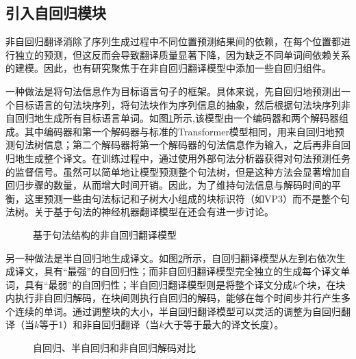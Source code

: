 
\subsection{引入自回归模块}

\parinterval 非自回归翻译消除了序列生成过程中不同位置预测结果间的依赖，在每个位置都进行独立的预测，但这反而会导致翻译质量显著下降，因为缺乏不同单词间依赖关系的建模。因此，也有研究聚焦于在非自回归翻译模型中添加一些自回归组件。

\parinterval 一种做法是将句法信息作为目标语言句子的框架。具体来说，先自回归地预测出一个目标语言的句法块序列，将句法块作为序列信息的抽象，然后根据句法块序列非自回归地生成所有目标语言单词。如图\ref{fig:14-21}所示,该模型由一个编码器和两个解码器组成。其中编码器和第一个解码器与标准的Transformer模型相同，用来自回归地预测句法树信息；第二个解码器将第一个解码器的句法信息作为输入，之后再非自回归地生成整个译文。在训练过程中，通过使用外部句法分析器获得对句法预测任务的监督信号。虽然可以简单地让模型预测整个句法树，但是这种方法会显著增加自回归步骤的数量，从而增大时间开销。因此，为了维持句法信息与解码时间的平衡，这里预测一些由句法标记和子树大小组成的块标识符（如VP3）而不是整个句法树。关于基于句法的神经机器翻译模型在{\chapterfifteen}还会有进一步讨论。

\begin{figure}[htp]
\centering

\caption{基于句法结构的非自回归翻译模型}
\label{fig:14-21}
\end{figure}

\parinterval 另一种做法是半自回归地生成译文。如图\ref{fig:14-20}所示，自回归翻译模型从左到右依次生成译文，具有“最强”的自回归性；而非自回归翻译模型完全独立的生成每个译文单词，具有“最弱”的自回归性；半自回归翻译模型则是将整个译文分成$k$个块，在块内执行非自回归解码，在块间则执行自回归的解码，能够在每个时间步并行产生多个连续的单词。通过调整块的大小，半自回归翻译模型可以灵活的调整为自回归翻译（当$k$等于1）和非自回归翻译（当$k$大于等于最大的译文长度）。

\begin{figure}[htp]
\centering

\caption{自回归、半自回归和非自回归解码对比}
\label{fig:14-20}
\end{figure}

